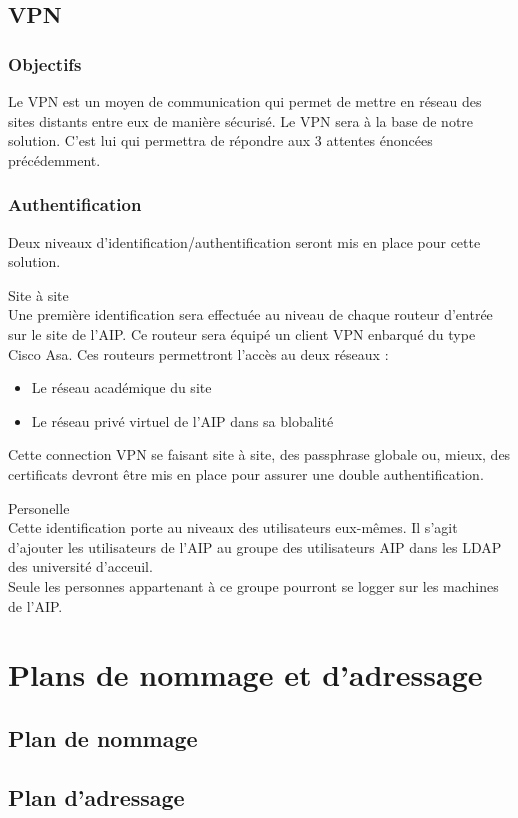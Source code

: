 \documentclass[a4paper]{article}
\begin{document}
\subsection{VPN}

\subsubsection{Objectifs}
Le VPN est un moyen de communication qui permet de mettre en réseau des sites distants entre eux de manière sécurisé.
Le VPN sera à la base de notre solution. C'est lui qui permettra de répondre aux 3 attentes énoncées précédemment.

\subsubsection{Authentification}

Deux niveaux d'identification/authentification seront mis en place pour cette solution.
\begin{description}
\item{Site à site} \\
Une première identification sera effectuée au niveau de chaque routeur d'entrée sur le site de l'AIP. Ce routeur sera équipé un client VPN enbarqué du type Cisco Asa. Ces routeurs permettront l'accès au deux réseaux : 
\begin{itemize}
\item Le réseau académique du site
\item Le réseau privé virtuel de l'AIP dans sa blobalité
\end{itemize}
Cette connection VPN se faisant site à site, des passphrase globale ou, mieux, des certificats devront être mis en place pour assurer une double authentification.
\item{Personelle} \\
Cette identification porte au niveaux des utilisateurs eux-mêmes. Il s'agit d'ajouter les utilisateurs de l'AIP au groupe des utilisateurs AIP dans les LDAP des université d'acceuil.\\
Seule les personnes appartenant à ce groupe pourront se logger sur les machines de l'AIP.

\end{description}

	
\section{Plans de nommage et d'adressage}
	\subsection{Plan de nommage}
	\subsection{Plan d'adressage}

	
\end{document}

